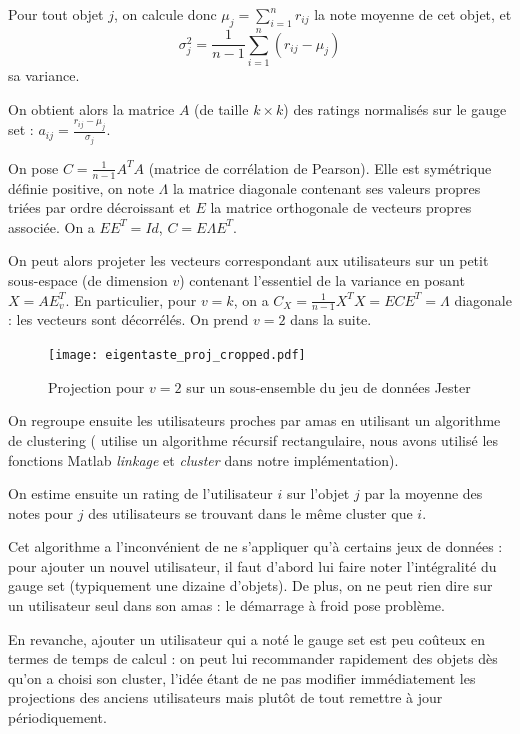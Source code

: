 \documentclass[11pt, openany, a4paper]{article}
\begin{document}
		Pour tout objet $j$, on calcule donc $\mu_j=\sum_{i=1}^n r_{ij}$ la note moyenne de cet objet, et $$\sigma_j^2 = \frac{1}{n-1} \sum_{i=1}^{n} (r_{ij} - \mu_j)$$ sa variance.
		
		On obtient alors la matrice $A$ (de taille $k\times k$) des ratings normalisés sur le gauge set : $a_{ij} = \frac{r_{ij}-\mu_j}{\sigma_j}$.
		
		On pose $C=\frac{1}{n-1} A^T A$ (matrice de corrélation de Pearson). Elle est symétrique définie positive, on note $\Lambda$ la matrice diagonale contenant ses valeurs propres triées par ordre décroissant et $E$ la matrice orthogonale de vecteurs propres associée. On a $EE^T = Id$, $C = E\Lambda E^T$.
		
		On peut alors projeter les vecteurs correspondant aux utilisateurs sur un petit sous-espace (de dimension $v$) contenant l'essentiel de la variance en posant $X=AE^T_v$. 
		En particulier, pour $v=k$, on a $C_X = \frac{1}{n-1} X^T X = ECE^T = \Lambda$ diagonale : les vecteurs sont décorrélés.
		On prend $v=2$ dans la suite.
		
			\begin{figure}[ht!]
				\centering
				\texttt{[image: eigentaste\_proj\_cropped.pdf]}
				\caption{Projection pour $v=2$ sur un sous-ensemble du jeu de données Jester}
			\end{figure}
			
		On regroupe ensuite les utilisateurs proches par amas en utilisant un algorithme de clustering (\cite{Goldberg2001} utilise un algorithme récursif rectangulaire, nous avons utilisé les fonctions Matlab \emph{linkage} et \emph{cluster} dans notre implémentation).
		
		On estime ensuite un rating de l'utilisateur $i$ sur l'objet $j$ par la moyenne des notes pour $j$ des utilisateurs se trouvant dans le même cluster que $i$.
		
		\medskip
						
		Cet algorithme a l'inconvénient de ne s'appliquer qu'à certains jeux de données : pour ajouter un nouvel utilisateur, il faut d'abord lui faire noter l'intégralité du gauge set (typiquement une dizaine d'objets). De plus, on ne peut rien dire sur un utilisateur seul dans son amas : le démarrage à froid pose problème.
		
		En revanche, ajouter un utilisateur qui a noté le gauge set est peu coûteux en termes de temps de calcul : on peut lui recommander rapidement des objets dès qu'on a choisi son cluster, l'idée étant de ne pas modifier immédiatement les projections des anciens utilisateurs mais plutôt de tout remettre à jour périodiquement.
		
\end{document}
